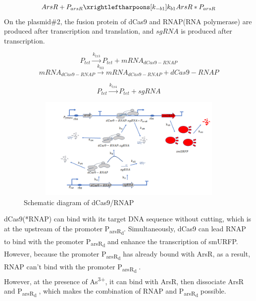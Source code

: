 \begin{equation}
ArsR+P_{arsR} \xrightleftharpoons[k_{-b1}]{k_{b1}}ArsR*P_{arsR} 
\end{equation} 
On the plasmid\#2, the fusion protein of dCas9 and RNAP(RNA polymerase) are produced after transcription and translation, and $sgRNA$ is produced after transcription.


\begin{equation}
P_{tet} \stackrel{k_{tx3}}{\longrightarrow} P_{tet} +mRNA_{dCas9-RNAP}
\end{equation}
\begin{equation}
mRNA_{dCas9-RNAP} \stackrel{k_{tl3}}{\longrightarrow} mRNA_{dCas9-RNAP}+dCas9-RNAP
\end{equation}

\begin{equation}
P_{tet} \stackrel{k_{tx4}}{\longrightarrow} P_{tet} +sgRNA
\end{equation}

\begin{figure}[h]
	\centering
	\includegraphics[width=12cm,height=5cm]{2}
	\caption{Schematic diagram of dCas9/RNAP}
\end{figure}

dCas9(*RNAP) can bind with its target DNA sequence without cutting, which is at the upstream of the promoter P\textsubscript{arsR\textsubscript{d}}. Simultaneously, dCas9 can lead RNAP to bind with the promoter P\textsubscript{arsR\textsubscript{d}} and enhance the transcription of smURFP. However, because the promoter P\textsubscript{arsR\textsubscript{d}} has already bound with ArsR, as a result, RNAP can't bind with the promoter P\textsubscript{arsR\textsubscript{d}} \cite{bikard2013programmable}. \\ 

However, at the presence of As\textsuperscript{3+}, it can bind with ArsR, then dissociate ArsR and P\textsubscript{arsR\textsubscript{d}} , which makes the combination of RNAP and P\textsubscript{arsR\textsubscript{d}} possible. \\

